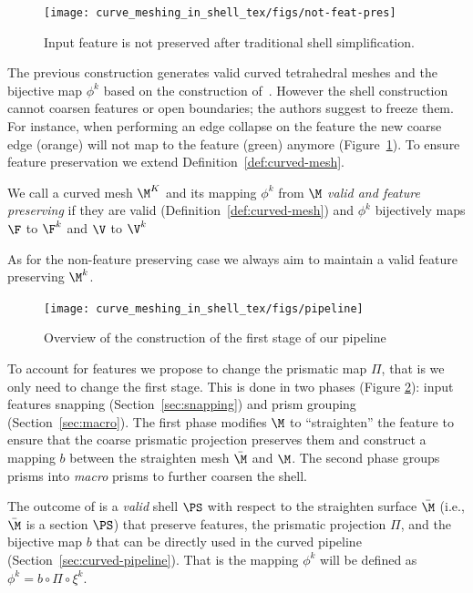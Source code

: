 \begin{figure}
    \centering
    \texttt{[image: curve\_meshing\_in\_shell\_tex/figs/not-feat-pres]}
    \caption{Input feature is not preserved after traditional shell simplification.}
    \label{bichon:fig:not-feat-pres}
\end{figure}

The previous construction generates valid curved tetrahedral meshes and the bijective map $\phi^k$ based on the construction of~\cite{jiang2020bijective}. However the shell construction cannot coarsen features or open boundaries; the authors suggest to freeze them. For instance, when performing an edge collapse on the feature the new coarse edge (orange) will not map to the feature (green) anymore (Figure~\ref{bichon:fig:not-feat-pres}). 
To ensure feature preservation we extend Definition~\ref{def:curved-mesh}.
\begin{definition}\label{def:curved-features}
We call a curved mesh $\M^K$ and its mapping $\phi^k$ from $\M$ \emph{valid and feature preserving} if they are valid (Definition~\ref{def:curved-mesh}) and $\phi^k$ bijectively maps $\F$ to $\F^k$ and $\V$ to $\V^k$
\end{definition}
As for the non-feature preserving case we always aim to maintain a valid feature preserving $\M^k$.


\begin{figure}
    \centering
    \texttt{[image: curve\_meshing\_in\_shell\_tex/figs/pipeline]}
    \caption{Overview of the construction of the first stage of our pipeline}
    \label{bichon:fig:stage-1}
\end{figure}

To account for features we propose to change the prismatic map $\Pi$, that is we only need to change the first stage. This is done in two phases (Figure \ref{bichon:fig:stage-1}): input features snapping (Section~\ref{sec:snapping}) and prism grouping (Section~\ref{sec:macro}). The first phase modifies $\M$ to ``straighten'' the feature to ensure that the coarse prismatic projection preserves them and construct a mapping $b$ between the straighten mesh $\bar\M$ and $\M$. The second phase groups prisms into \emph{macro} prisms to further coarsen the shell.

The outcome of is a \emph{valid} shell $\PS$ with respect to the straighten surface $\bar\M$ (i.e., $\bar\M$ is a section $\PS$) that preserve features, the prismatic projection $\Pi$, and the bijective map $b$ that can be directly used in the curved pipeline (Section~\ref{sec:curved-pipeline}). That is the mapping  $\phi^k$ will be defined as $\phi^k = b \circ \Pi \circ \xi^k$.


